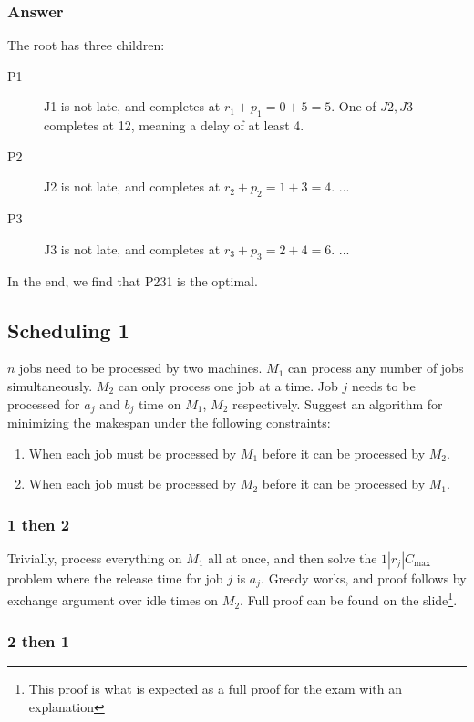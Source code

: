\documentclass{idc_msc}
\begin{document}
\subsubsection{Answer}

The root has three children:

\begin{description}
  \item[P1] J1 is not late, and completes at \(r_1 + p_1 = 0 + 5 = 5\). One of \(J2, J3\) completes at 12, meaning a delay of at least 4.
  \item[P2] J2 is not late, and completes at \(r_2 + p_2 = 1 + 3 = 4\). ...
  \item[P3] J3 is not late, and completes at \(r_3 + p_3 = 2 + 4 = 6\). ...
\end{description}

In the end, we find that P231 is the optimal.

\subsection{Scheduling 1}

\(n\) jobs need to be processed by two machines.
\(M_1\) can process any number of jobs simultaneously.
\(M_2\) can only process one job at a time.
Job \(j\) needs to be processed for \(a_j\) and \(b_j\) time on \(M_1\), \(M_2\) respectively.
Suggest an algorithm for minimizing the makespan under the following constraints:

\begin{enumerate}
  \item When each job must be processed by \(M_1\) before it can be processed by \(M_2\).
  \item When each job must be processed by \(M_2\) before it can be processed by \(M_1\).
\end{enumerate}

\subsubsection{1 then 2}

Trivially, process everything on \(M_1\) all at once, and then solve the \(1|r_j|C_{\max}\) problem where the release time for job \(j\) is \(a_j\).
Greedy works, and proof follows by exchange argument over idle times on \(M_2\). Full proof can be found on the slide\footnote{This proof is what is expected as a full proof for the exam with an explanation}.

\subsubsection{2 then 1}
\end{document}
